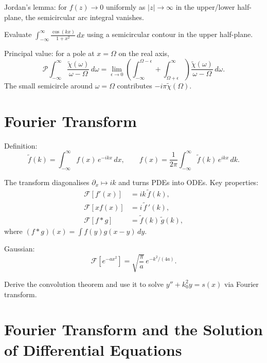 Jordan's lemma: for $f(z)\to0$ uniformly as $|z|\to\infty$ in the
upper/lower half-plane, the semicircular arc integral vanishes.

\begin{exercise}
Evaluate $\int_{-\infty}^{\infty}\frac{\cos(kx)}{1+x^2}\,dx$ using a semicircular
contour in the upper half-plane.
\end{exercise}

Principal value: for a pole at $x=\Omega$ on the real axis,
\begin{equation}
\mathcal P\int_{-\infty}^{\infty}\frac{\tilde\chi(\omega)}{\omega-\Omega}\,d\omega
= \lim_{\epsilon\to0}\left(
\int_{-\infty}^{\Omega-\epsilon}+\int_{\Omega+\epsilon}^{\infty}
\right)\frac{\tilde\chi(\omega)}{\omega-\Omega}\,d\omega.
\label{eq:6.4.2}
\end{equation}
The small semicircle around $\omega=\Omega$ contributes $-i\pi\tilde\chi(\Omega)$.

\section{Fourier Transform}

Definition:
\begin{equation}
\tilde f(k)=\int_{-\infty}^{\infty}f(x)\,e^{-ikx}\,dx,\qquad
f(x)=\frac{1}{2\pi}\int_{-\infty}^{\infty}\tilde f(k)\,e^{ikx}\,dk.
\label{eq:6.5.1}
\end{equation}

The transform diagonalises $\partial_x\mapsto ik$ and turns PDEs into ODEs.
Key properties:
\begin{align}
\mathcal F[f'(x)] &= ik\,\tilde f(k),\\
\mathcal F[xf(x)] &= i\,\widetilde f\,'(k),\\
\mathcal F[f*g] &= \tilde f(k)\,\tilde g(k),
\label{eq:6.5.2}
\end{align}
where $(f*g)(x)=\int f(y)g(x-y)\,dy$.

Gaussian:
\begin{equation}
\mathcal F[e^{-ax^2}] = \sqrt{\frac{\pi}{a}}\,e^{-k^2/(4a)}.
\label{eq:6.5.3}
\end{equation}

\begin{exercise}
Derive the convolution theorem and use it to solve
$y''+k_0^2y=s(x)$ via Fourier transform.
\end{exercise}

\section{Fourier Transform and the Solution of Differential Equations}

